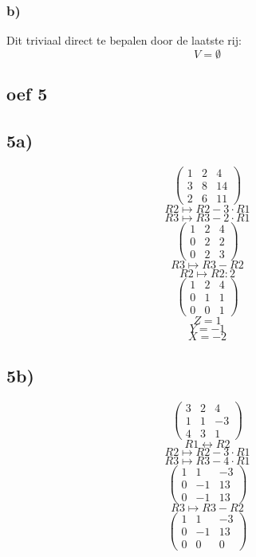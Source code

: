 \documentclass[10pt,a4paper]{article}
\begin{document}
\subsubsection*{b)}
Dit triviaal direct te bepalen door de laatste rij:
\[
V=\emptyset
\]
\subsection*{oef 5}
\subsection*{5a)}
\[
\begin{pmatrix}
1 &  2 &  4\\
3 &  8 &  14\\
2 &  6 &  11
\end{pmatrix}
\]
\[ R2 \longmapsto R2 -3\cdot R1\]
\[ R3 \longmapsto R3 -2\cdot R1\]
\[
\begin{pmatrix}
1 &  2 &  4\\
0 &  2 &  2\\
0 &  2 &  3
\end{pmatrix}
\]
\[ R3 \longmapsto R3 - R2\]
\[ R2 \longmapsto R2 : 2\]
\[
\begin{pmatrix}
1 &  2 &  4\\
0 &  1 &  1\\
0 &  0 &  1
\end{pmatrix}
\]
\[ Z=1\]
\[ Y=-1\]
\[ X=-2\]

\subsection*{5b)}
\[
\begin{pmatrix}
3 &  2 &  4\\
1 &  1 &  -3\\
4 &  3 &  1
\end{pmatrix}
\]
\[R1 \leftrightarrow R2\]
\[ R2 \longmapsto R2 -3\cdot R1\]
\[ R3 \longmapsto R3 -4\cdot R1\]
\[
\begin{pmatrix}
1 &  1 &  -3\\
0 &  -1 &  13\\
0 &  -1 &  13
\end{pmatrix}
\]
\[ R3 \longmapsto R3 - R2\]
\[
\begin{pmatrix}
1 &  1 &  -3\\
0 &  -1 &  13\\
0 &  0 &  0
\end{pmatrix}
\]
\end{document}
